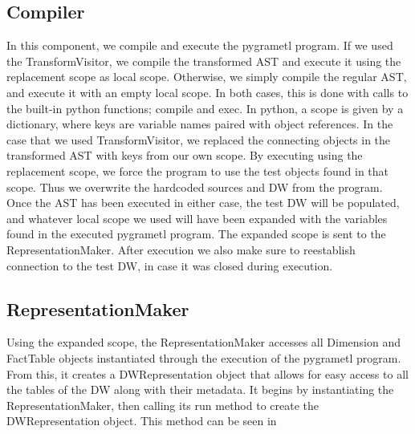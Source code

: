 \subsection{Compiler}
In this component, we compile and execute the pygrametl program. If we used the TransformVisitor, we compile the transformed AST and execute it using the replacement scope as local scope. Otherwise, we simply compile the regular AST, and execute it with an empty local scope. In both cases, this is done with calls to the built-in python functions; compile and exec. In python, a scope is given by a dictionary, where keys are variable names paired with object references. In the case that we used TransformVisitor, we replaced the connecting objects in the transformed AST with keys from our own scope. By executing using the replacement scope, we force the program to use the test objects found in that scope. Thus we overwrite the hardcoded sources and DW from the program. Once the AST has been executed in either case, the test DW will be populated, and whatever local scope we used will have been expanded with the variables found in the executed pygrametl program. The expanded scope is sent to the RepresentationMaker. After execution we also make sure to reestablish connection to the test DW, in case it was closed during execution.

\subsection{RepresentationMaker}\label{ssec:Representation}
Using the expanded scope, the RepresentationMaker accesses all Dimension and FactTable objects instantiated through the execution of the pygrametl program. From this, it creates a DWRepresentation object that allows for easy access to all the tables of the DW along with their metadata. It begins by instantiating the RepresentationMaker, then calling its run method to create the DWRepresentation object. This method can be seen in 


